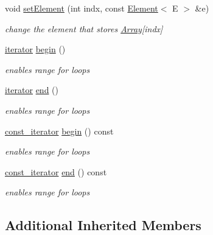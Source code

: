 \begin{DoxyCompactItemize}
void \mbox{\hyperlink{classbridges_1_1datastructure_1_1_array1_d_a1494c33b1f37bc4c9bc983f1f181488f}{set\+Element}} (int indx, const \mbox{\hyperlink{classbridges_1_1datastructure_1_1_element}{Element}}$<$ E $>$ \&e)
\begin{DoxyCompactList}\small\item\em change the element that stores \mbox{\hyperlink{classbridges_1_1datastructure_1_1_array}{Array}}\mbox{[}indx\mbox{]} \end{DoxyCompactList}\item 
\mbox{\hyperlink{classbridges_1_1datastructure_1_1_array1_d_1_1iterator}{iterator}} \mbox{\hyperlink{classbridges_1_1datastructure_1_1_array1_d_ad93131c3f7f2e446bedc02d36ac7ddc5}{begin}} ()
\begin{DoxyCompactList}\small\item\em enables range for loops \end{DoxyCompactList}\item 
\mbox{\hyperlink{classbridges_1_1datastructure_1_1_array1_d_1_1iterator}{iterator}} \mbox{\hyperlink{classbridges_1_1datastructure_1_1_array1_d_a238e21eb9afcd0f32e3612b36b7d1a2a}{end}} ()
\begin{DoxyCompactList}\small\item\em enables range for loops \end{DoxyCompactList}\item 
\mbox{\hyperlink{classbridges_1_1datastructure_1_1_array1_d_1_1const__iterator}{const\+\_\+iterator}} \mbox{\hyperlink{classbridges_1_1datastructure_1_1_array1_d_a61e7a77165129de2016633ce24284417}{begin}} () const
\begin{DoxyCompactList}\small\item\em enables range for loops \end{DoxyCompactList}\item 
\mbox{\hyperlink{classbridges_1_1datastructure_1_1_array1_d_1_1const__iterator}{const\+\_\+iterator}} \mbox{\hyperlink{classbridges_1_1datastructure_1_1_array1_d_afa8c2d7cb3db9a506baa18d383aabdb5}{end}} () const
\begin{DoxyCompactList}\small\item\em enables range for loops \end{DoxyCompactList}\end{DoxyCompactItemize}
\subsection*{Additional Inherited Members}


